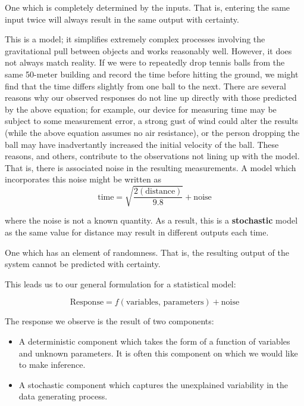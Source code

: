 \documentclass[]{book}
\providecommand{\tightlist}{%
  \setlength{\itemsep}{0pt}\setlength{\parskip}{0pt}}
\theoremstyle{definition}
\theoremstyle{definition}
\theoremstyle{definition}
\theoremstyle{remark}
\let\BeginKnitrBlock\begin \let\EndKnitrBlock\end
\begin{document}
\BeginKnitrBlock{definition}[Deterministic Process]
\protect\hypertarget{def:defn-deterministic-process}{}{\label{def:defn-deterministic-process}
{} }One which is completely
determined by the inputs. That is, entering the same input twice will
always result in the same output with certainty.
\EndKnitrBlock{definition}

This is a model; it simplifies extremely complex processes involving the
gravitational pull between objects and works reasonably well. However,
it does not always match reality. If we were to repeatedly drop tennis
balls from the same 50-meter building and record the time before hitting
the ground, we might find that the time differs slightly from one ball
to the next. There are several reasons why our observed responses do not
line up directly with those predicted by the above equation; for
example, our device for measuring time may be subject to some
measurement error, a strong gust of wind could alter the results (while
the above equation assumes no air resistance), or the person dropping
the ball may have inadvertantly increased the initial velocity of the
ball. These reasons, and others, contribute to the observations not
lining up with the model. That is, there is associated noise in the
resulting measurements. A model which incorporates this noise might be
written as
\[\text{time} = \sqrt{\frac{2(\text{distance})}{9.8}} + \text{noise}\]

where the noise is not a known quantity. As a result, this is a
\textbf{stochastic} model as the same value for distance may result in
different outputs each time.

\BeginKnitrBlock{definition}[Stochastic Process]
\protect\hypertarget{def:defn-stochastic-process}{}{\label{def:defn-stochastic-process}
{} }One which has an element of
randomness. That is, the resulting output of the system cannot be
predicted with certainty.
\EndKnitrBlock{definition}

This leads us to our general formulation for a statistical model:

\begin{equation}
  \text{Response} = f(\text{variables, parameters}) + \text{noise}
  \label{eq:general-model}
\end{equation}

The response we observe is the result of two components:

\begin{itemize}
\tightlist
\item
  A deterministic component which takes the form of a function of
  variables and unknown parameters. It is often this component on which
  we would like to make inference.
\item
  A stochastic component which captures the unexplained variability in
  the data generating process.
\end{itemize}
\end{document}
